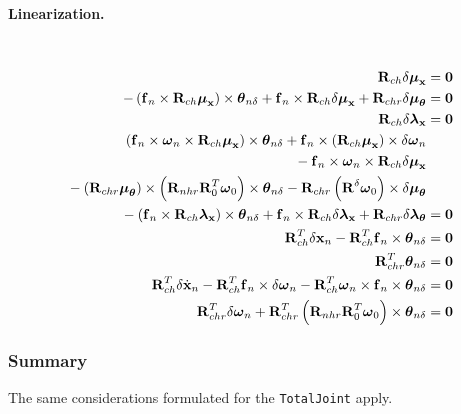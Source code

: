 \documentclass[10pt,dvips,fleqn,subeqn]{report}
\newcommand{\T}[1]{\bm{\mathbf{#1}}}
\newcommand{\TT}[1]{\bm{\mathbf{#1}}}
\begin{document}
\paragraph{Linearization.} \
\begin{subequations}
\begin{align}
	\TT{R}_{ch} \delta\T{\mu}_{\T{x}} &= \T{0} \\
%
	- \plbr{
		\T{f}_n \times \TT{R}_{ch} \T{\mu}_{\T{x}}
	} \times \T{\theta}_{n\delta}
	+ \T{f}_n \times \TT{R}_{ch} \delta\T{\mu}_{\T{x}} + \TT{R}_{chr} \delta\T{\mu}_{\T{\theta}} &= \T{0} \\
%
	\TT{R}_{ch} \delta\T{\lambda}_{\T{x}} &= \T{0} \\
%
	\plbr{
		\T{f}_n \times \T{\omega}_n \times \TT{R}_{ch} \T{\mu}_{\T{x}}
	} \times \T{\theta}_{n\delta} 
	+ \T{f}_n \times \plbr{\TT{R}_{ch} \T{\mu}_{\T{x}}} \times \delta\T{\omega}_n & \nonumber \\
	\mbox{} - \T{f}_n \times \T{\omega}_n \times \TT{R}_{ch} \delta\T{\mu}_{\T{x}} & \nonumber \\
	\mbox{} - \plbr{\TT{R}_{chr} \T{\mu}_{\T{\theta}}}
		\times \plbr{\TT{R}_{nhr} \TT{R}_0^T \T{\omega}_0} \times \T{\theta}_{n\delta} 
	- \TT{R}_{chr} \plbr{\TT{R}^{\delta} \T{\omega}_0} \times \delta\T{\mu}_{\T{\theta}} & \nonumber \\
	\mbox{} - \plbr{\T{f}_n \times \TT{R}_{ch} \T{\lambda}_{\T{x}}} \times \T{\theta}_{n\delta}
	+ \T{f}_n \times \TT{R}_{ch} \delta\T{\lambda}_{\T{x}} + \TT{R}_{chr} \delta\T{\lambda}_{\T{\theta}} &= \T{0} \\
%
	\TT{R}_{ch}^T \delta\T{x}_n - \TT{R}_{ch}^T\T{f}_n\times \T{\theta}_{n\delta} &= \T{0} \\
%
	\TT{R}_{chr}^T \T{\theta}_{n\delta} &= \T{0} \\
%
	\TT{R}_{ch}^T \delta\dot{\T{x}}_n
	- \TT{R}_{ch}^T \T{f}_n \times \delta\T{\omega}_n
	- \TT{R}_{ch}^T \T{\omega}_n \times \T{f}_n \times \T{\theta}_{n\delta} &= \T{0} \\
%
	\TT{R}_{chr}^T \delta\T{\omega}_n
	+ \TT{R}_{chr}^T \plbr{\TT{R}_{nhr} \TT{R}_0^T \T{\omega}_0} \times \T{\theta}_{n\delta} &= \T{0}
\end{align}
\end{subequations}



\subsubsection{Summary}
The same considerations formulated for the \texttt{TotalJoint} apply.
\end{document}
